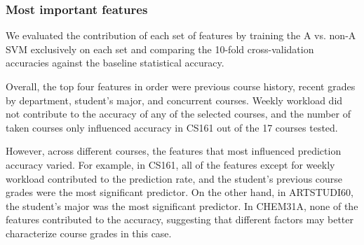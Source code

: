\subsubsection{Most important features}

We evaluated the contribution of each set of features by training the A vs. non-A SVM exclusively on each set  and comparing the 10-fold cross-validation accuracies against the baseline statistical accuracy.

Overall, the top four features in order were previous course history, recent grades by department, student's major, and concurrent courses. Weekly workload did not contribute to the accuracy of any of the selected courses, and the number of taken courses only influenced accuracy in CS161 out of the 17 courses tested.

However, across different courses, the features that most influenced prediction accuracy varied. For example, in CS161, all of the features except for weekly workload contributed to the prediction rate, and the student's previous course grades were the most significant predictor. On the other hand, in ARTSTUDI60, the student's major was the most significant predictor. In CHEM31A, none of the features contributed to the accuracy, suggesting that different factors may better characterize course grades in this case.

